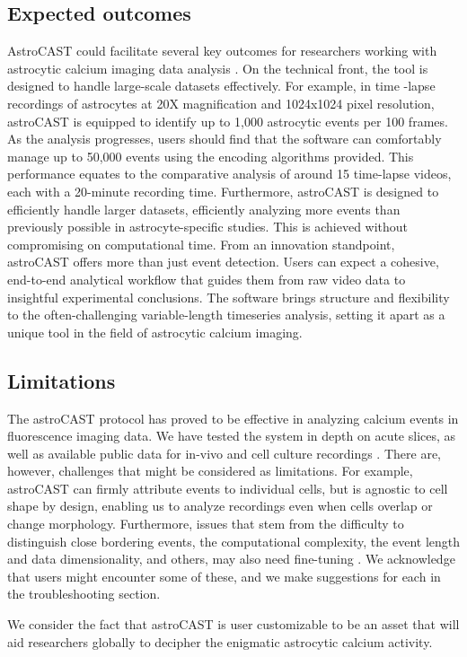 \subsection{Expected outcomes}

AstroCAST could facilitate several key outcomes for researchers working with astrocytic calcium imaging data analysis
. On the technical front, the tool is designed to handle large-scale datasets effectively. For example, in time
-lapse recordings of astrocytes at 20X magnification and 1024x1024 pixel resolution, astroCAST is equipped to
identify up to 1,000 astrocytic events per 100 frames. As the analysis progresses, users should find that the
software can comfortably manage up to 50,000 events using the encoding algorithms provided. This performance equates
to the comparative analysis of around 15 time-lapse videos, each with a 20-minute recording time. Furthermore,
astroCAST is designed to efficiently handle larger datasets, efficiently analyzing more events than previously
possible in astrocyte-specific studies. This is achieved without compromising on computational time. From an
innovation standpoint, astroCAST offers more than just event detection. Users can expect a cohesive, end-to-end
analytical workflow that guides them from raw video data to insightful experimental conclusions. The software brings
structure and flexibility to the often-challenging variable-length timeseries analysis, setting it apart as a unique
tool in the field of astrocytic calcium imaging.

\subsection{Limitations}

The astroCAST protocol has proved to be effective in analyzing calcium events in fluorescence imaging data. We have
tested the system in depth on acute slices, as well as available public data for in-vivo and cell culture recordings
. There are, however, challenges that might be considered as limitations. For example, astroCAST can firmly attribute
events to individual cells, but is agnostic to cell shape by design, enabling us to analyze recordings even when
cells overlap or change morphology. Furthermore, issues that stem from the difficulty to distinguish close bordering
events, the computational complexity, the event length and data dimensionality, and others, may also need fine-tuning
. We acknowledge that users might encounter some of these, and we make suggestions for each in the troubleshooting
section.

We consider the fact that astroCAST is user customizable to be an asset that will aid researchers globally to
decipher the enigmatic astrocytic calcium activity.